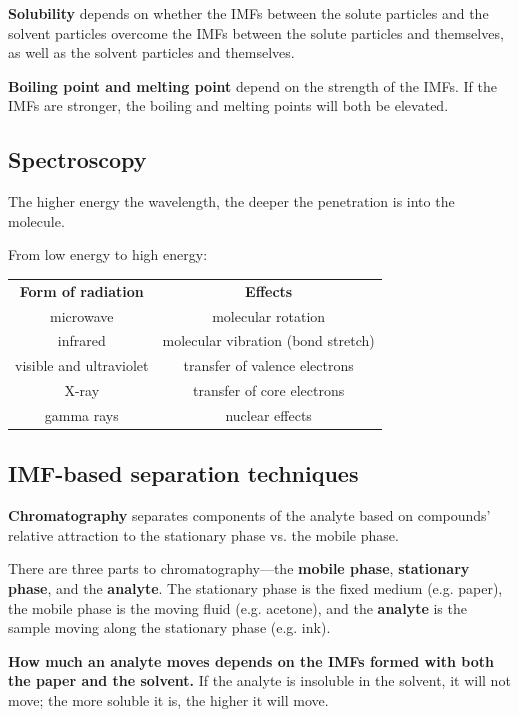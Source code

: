 \documentclass[a4paper, 12pt]{article}
\begin{document}
\textbf{Solubility} depends on whether the IMFs between the solute particles and the solvent particles overcome the IMFs between the solute particles and themselves, as well as the solvent particles and themselves.

\textbf{Boiling point and melting point} depend on the strength of the IMFs. If the IMFs are stronger, the boiling and melting points will both be elevated.

\subsection*{Spectroscopy}

The higher energy the wavelength, the deeper the penetration is into the molecule.

From low energy to high energy:

\begin{table}[H]
\centering
\begin{tabular}{c c}
\textbf{Form of radiation} & \textbf{Effects} \\
microwave & molecular rotation \\
infrared & molecular vibration (bond stretch) \\
visible and ultraviolet & transfer of valence electrons \\
X-ray & transfer of core electrons \\
gamma rays & nuclear effects
\end{tabular}
\end{table}

\subsection*{IMF-based separation techniques}

\textbf{Chromatography} separates components of the analyte based on compounds' relative attraction to the stationary phase vs. the mobile phase.

There are three parts to chromatography---the \textbf{mobile phase}, \textbf{stationary phase}, and the \textbf{analyte}. The stationary phase is the fixed medium (e.g. paper), the mobile phase is the moving fluid (e.g. acetone), and the \textbf{analyte} is the sample moving along the stationary phase (e.g. ink).

\textbf{How much an analyte moves depends on the IMFs formed with both the paper and the solvent.} If the analyte is insoluble in the solvent, it will not move; the more soluble it is, the higher it will move.
\end{document}
